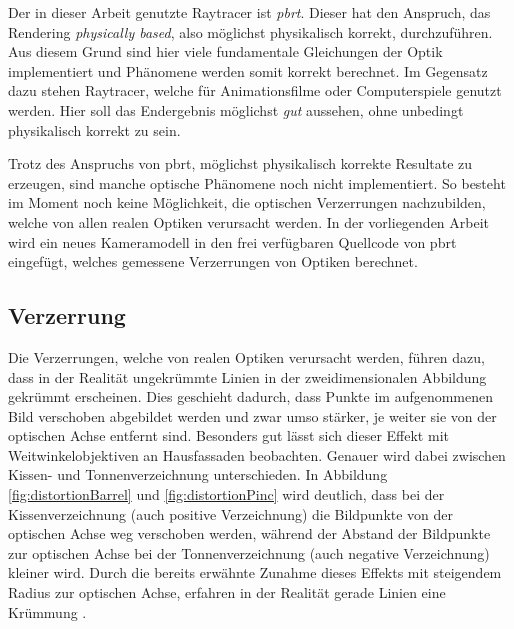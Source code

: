 Der in dieser Arbeit genutzte Raytracer ist \textit{pbrt}\cite{pbrt}. Dieser hat den Anspruch, das Rendering \textit{physically based}, also möglichst physikalisch korrekt, durchzuführen. Aus diesem Grund sind hier viele fundamentale Gleichungen der Optik implementiert und Phänomene werden somit korrekt berechnet. Im Gegensatz dazu stehen Raytracer, welche für Animationsfilme oder Computerspiele genutzt werden. Hier soll das Endergebnis möglichst \textit{gut} aussehen, ohne unbedingt physikalisch korrekt zu sein. 

Trotz des Anspruchs von pbrt, möglichst physikalisch korrekte Resultate zu erzeugen, sind manche optische Phänomene noch nicht implementiert. So besteht im Moment noch keine Möglichkeit, die optischen Verzerrungen nachzubilden, welche von allen realen Optiken verursacht werden.
In der vorliegenden Arbeit wird ein neues Kameramodell in den frei verfügbaren Quellcode von pbrt eingefügt, welches gemessene Verzerrungen von Optiken berechnet.

\subsection{Verzerrung}

Die Verzerrungen, welche von realen Optiken verursacht werden, führen dazu, dass in der Realität ungekrümmte Linien in der zweidimensionalen Abbildung gekrümmt erscheinen. Dies geschieht dadurch, dass Punkte im aufgenommenen Bild verschoben abgebildet werden und zwar umso stärker, je weiter sie von der optischen Achse entfernt sind. Besonders gut lässt sich dieser Effekt mit Weitwinkelobjektiven an Hausfassaden beobachten. 
Genauer wird dabei zwischen Kissen- und Tonnenverzeichnung unterschieden. In Abbildung \ref{fig:distortionBarrel} und \ref{fig:distortionPinc} wird deutlich, dass bei der Kissenverzeichnung (auch positive Verzeichnung) die Bildpunkte von der optischen Achse weg verschoben werden, während der Abstand der Bildpunkte zur optischen Achse bei der Tonnenverzeichnung (auch negative Verzeichnung) kleiner wird. Durch die bereits erwähnte Zunahme dieses Effekts mit steigendem Radius zur optischen Achse, erfahren in der Realität gerade Linien eine Krümmung \cite{smith2000modern}.

